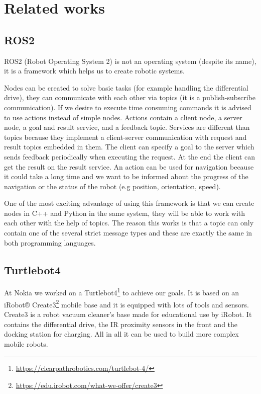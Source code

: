 \chapter{Related works}

\section{ROS2}

ROS2\cite{ROS2} (Robot Operating System 2) is not an operating system (despite its name), it is a framework which helps us to create robotic systems.

Nodes can be created to solve basic tasks (for example handling the differential drive), they can communicate with each other via topics (it is a publish-subscribe communication). If we desire to execute time consuming commands it is advised to use actions instead of simple nodes. Actions contain a client node, a server node, a goal and result service, and a feedback topic. Services are different than topics because they implement a client-server communication with request and result topics embedded in them. The client can specify a goal to the server which sends feedback periodically when executing the request. At the end the client can get the result on the result service. An action can be used for navigation because it could take a long time and we want to be informed about the progress of the navigation or the status of the robot (e.g position, orientation, speed). 

One of the most exciting advantage of using this framework is that we can create nodes in C++ and Python in the same system, they will be able to work with each other with the help of topics. The reason this works is that a topic can only contain one of the several strict message types and these are exactly the same in both programming languages.

\section{Turtlebot4}

At Nokia we worked on a Turtlebot4\footnote{\url{https://clearpathrobotics.com/turtlebot-4/}} to achieve our goals. It is based on an iRobot® Create3\footnote{\url{https://edu.irobot.com/what-we-offer/create3}} mobile base and it is equipped with lots of tools and sensors. Create3 is a robot vacuum cleaner's base made for educational use by iRobot. It contains the differential drive, the IR proximity sensors in the front and the docking station for charging. All in all it can be used to build more complex mobile robots.

